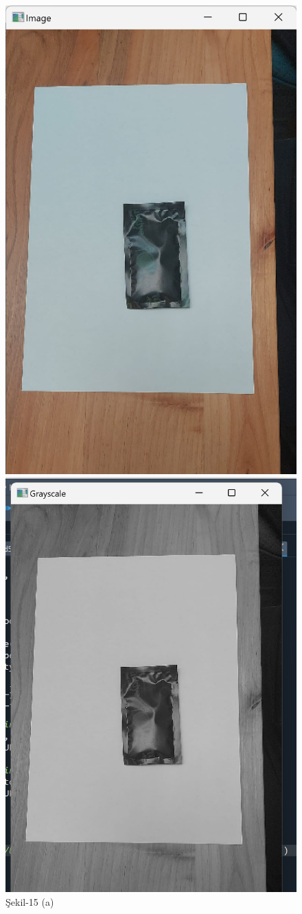 \documentclass[11pt,a4paper]{report}
\begin{document}
	\begin{figure}[!h] %
		\centering
		
		\begin{minipage}[t]{0.470\linewidth}
			\centering
			\includegraphics[width=0.65\linewidth]{nesne-2-orijinal}
			\caption*{Şekil-15 (a)}
		\end{minipage}\hfill
		\begin{minipage}[t]{0.470\linewidth}
			\centering
			\includegraphics[width=0.65\linewidth]{nesne-2-siyah}

\end{minipage}
\end{figure}
\end{document}
